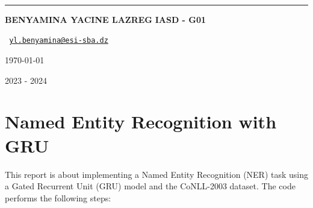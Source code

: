\documentclass[12pt, a4paper]{article}
\begin{document}
\begin{titlepage}



\begin{minipage}[t]{\linewidth}
\centering
{} \\
 \\
 \\
\end{minipage}
\vspace{12pt}
\hrule


\vspace{4cm}

\begin{center}

\vspace{2.5cm}


\huge{}

\vspace{0.5cm}

\normalsize
\uppercase{\textbf{Benyamina Yacine Lazreg}}
\normalsize
\uppercase{\textbf{IASD - G01}}

\texttt{
\href{mailto:yl.benyamina@esi-sba.dz}{yl.benyamina@esi-sba.dz}
}

\today

\vspace{2.5cm}


\vfill

\large
2023 - 2024 \\


\end{center}
\end{titlepage}


\thispagestyle{empty}
\clearpage

\section*{Named Entity Recognition with GRU}

This report is about implementing a Named Entity Recognition (NER) task using a Gated Recurrent Unit (GRU) model and the CoNLL-2003 dataset. The code performs the following steps:
\end{document}
